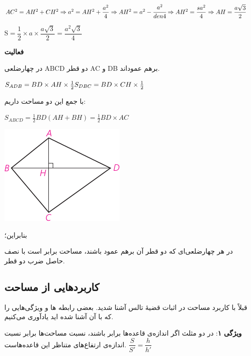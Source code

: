\documentclass[12pt, a4paper]{book}
\begin{document}
	\begin{flushleft}
	$
	AC^2 = AH^2 + CH^2 \Rightarrow a^2 = AH^2 + \dfrac{a^2}{4} \Rightarrow AH^2 = a^2 - \cfrac{a^2}{den4} \Rightarrow AH^2 = \dfrac{sa^2}{4} \Rightarrow AH = \dfrac{a\sqrt{3}}{2}
	$
	
	$
	\text{S} = \dfrac12 \times a \times \dfrac{a\sqrt{3}}{2} = \dfrac{a^2\sqrt{3}}{4}
	$
\end{flushleft}


\bigskip

\textbf{فعالیت}

\begin{minipage}{0.65\textwidth}
	در چهارضلعی ABCD دو قطر AC و DB برهم عموداند.
	\begin{flushleft}
		$ S_{ADB} = BD \times AH \times \frac12 \hfill S_{DBC} = BD \times CH \times \frac12 $
	\end{flushleft}
	با جمع این دو مساحت داریم:
	\begin{flushleft}
		$S_{ABCD} = \frac12 BD (AH + BH) = \frac12 BD \times AC$
	\end{flushleft}
\end{minipage}
\begin{minipage}{0.3\textwidth}
	\begin{flushleft}
		\includegraphics{"Shapes/Fasl - 3/Dars 2/P65-S4"}
	\end{flushleft}
\end{minipage}

بنابراین؛

در هر چهارضلعی‌ای که دو قطر آن برهم عمود باشند، مساحت برابر است با نصف حاصل ضرب دو قطر.

\subsection{کاربردهایی از مساحت}

قبلاً با کاربرد مساحت در اثبات قضیهٔ تالس آشنا شدید. بعضی رابطه ها و ویژگی‌هایی را که با آن آشنا شده اید یادآوری می‌کنیم.
\bigskip

\textbf{ویژگی ۱}:
در دو مثلث اگر اندازه‌ی قاعده‌ها برابر باشند، نسبت مساحت‌ها برابر نسبت اندازه‌ی ارتفاع‌های متناظر این قاعده‌هاست. \hfill
		$
			\dfrac{S}{S'} = \dfrac{h}{h'}
		$
\end{document}
